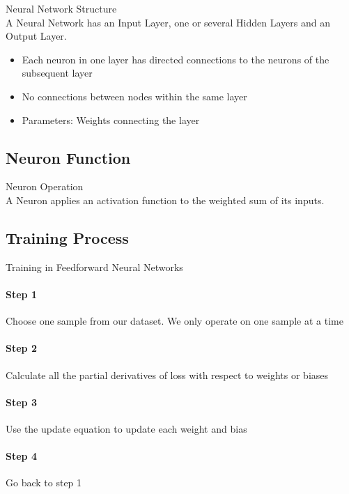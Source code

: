 \begin{definition}{Neural Network Structure}\\
A Neural Network has an Input Layer, one or several Hidden Layers and an Output Layer.
\begin{itemize}
    \item Each neuron in one layer has directed connections to the neurons of the subsequent layer
    \item No connections between nodes within the same layer
    \item Parameters: Weights connecting the layer
\end{itemize}
\end{definition}


\subsection{Neuron Function}

\begin{definition}{Neuron Operation}\\
A Neuron applies an activation function to the weighted sum of its inputs.
\end{definition}


\subsection{Training Process}

\begin{KR}{Training in Feedforward Neural Networks}\\
\paragraph{Step 1}
Choose one sample from our dataset. We only operate on one sample at a time

\paragraph{Step 2}
Calculate all the partial derivatives of loss with respect to weights or biases

\paragraph{Step 3}
Use the update equation to update each weight and bias

\paragraph{Step 4}
Go back to step 1
\end{KR}

